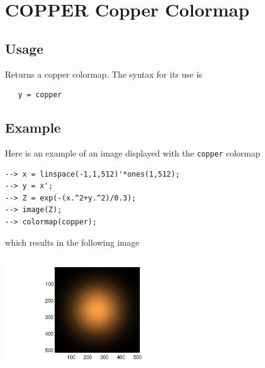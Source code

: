 \section{COPPER Copper Colormap}

\subsection{Usage}

Returns a copper colormap.  The syntax for its use is
\begin{verbatim}
   y = copper
\end{verbatim}
\subsection{Example}

Here is an example of an image displayed with the \verb|copper|
colormap
\begin{verbatim}
--> x = linspace(-1,1,512)'*ones(1,512);
--> y = x';
--> Z = exp(-(x.^2+y.^2)/0.3);
--> image(Z);
--> colormap(copper);
\end{verbatim}
which results in the following image


\centerline{\includegraphics[width=8cm]{copper1}}

